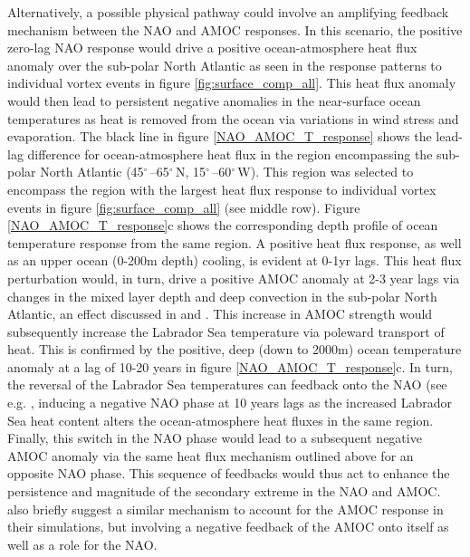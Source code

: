 Alternatively, a possible physical pathway could involve an amplifying feedback mechanism between the NAO and AMOC responses. In this scenario, the positive zero-lag NAO response would drive a positive ocean-atmosphere heat flux anomaly over the sub-polar North Atlantic as seen in the response patterns to individual vortex events in figure \ref{fig:surface_comp_all}. This heat flux anomaly would then lead to persistent negative anomalies in the near-surface ocean temperatures as heat is removed from the ocean via variations in wind stress and evaporation. The black line in figure \ref{NAO_AMOC_T_response} shows the lead-lag difference for ocean-atmosphere heat flux in the region encompassing the sub-polar North Atlantic (45$^{\circ}$\,–65$^{\circ}$\,N, 15$^{\circ}$\,–60$^{\circ}$\,W). This region was selected to encompass the region with the largest heat flux response to individual vortex events in figure \ref{fig:surface_comp_all} (see middle row). Figure \ref{NAO_AMOC_T_response}c shows the corresponding depth profile of ocean temperature response from the same region. A positive heat flux response, as well as an upper ocean (0-200m depth) cooling, is evident at 0-1yr lags. This heat flux perturbation would, in turn, drive a positive AMOC anomaly at 2-3 year lags via changes in the mixed layer depth and deep convection in the sub-polar North Atlantic, an effect discussed in \cite{delworthInterdecadal1993b} and \cite{medhaugMechanisms2012b}. This increase in AMOC strength would subsequently increase the Labrador Sea temperature via poleward transport of heat. This is confirmed by the positive, deep (down to 2000m) ocean temperature anomaly at a lag of 10-20 years in figure \ref{NAO_AMOC_T_response}c. In turn, the reversal of the Labrador Sea temperatures can feedback onto the NAO (see e.g. \cite{frankignoulInfluence2013b}, inducing a negative NAO phase at 10 years lags as the increased Labrador Sea heat content alters the ocean-atmosphere heat fluxes in the same region. Finally, this switch in the NAO phase would lead to a subsequent negative AMOC anomaly via the same heat flux mechanism outlined above for an opposite NAO phase. This sequence of feedbacks would thus act to enhance the persistence and magnitude of the secondary extreme in the NAO and AMOC. \cite{reichlerStratospheric2012b} also briefly suggest a similar mechanism to account for the AMOC response in their simulations, but involving a negative feedback of the AMOC onto itself as well as a role for the NAO. 


